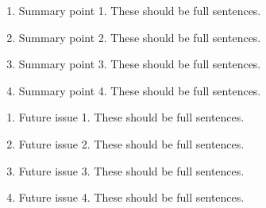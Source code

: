 \documentclass[a4paper]{ar-1col}
\begin{document}




\begin{summary}
\begin{enumerate}
\item Summary point 1. These should be full sentences.
\item Summary point 2. These should be full sentences.
\item Summary point 3. These should be full sentences.
\item Summary point 4. These should be full sentences.
\end{enumerate}
\end{summary}

\begin{issues}
\begin{enumerate}
\item Future issue 1. These should be full sentences.
\item Future issue 2. These should be full sentences.
\item Future issue 3. These should be full sentences.
\item Future issue 4. These should be full sentences.
\end{enumerate}
\end{issues}
\end{document}
